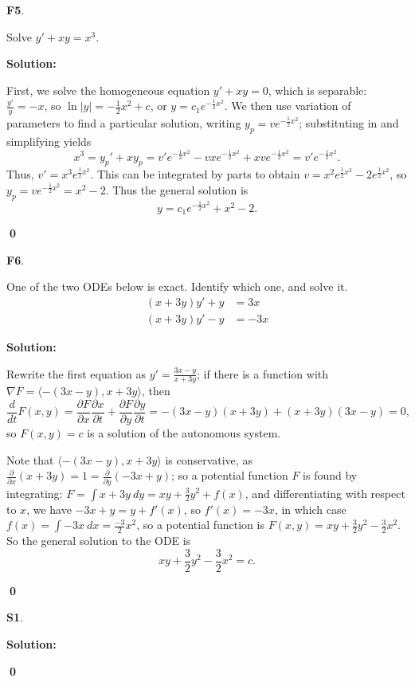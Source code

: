 \documentclass{article}
\newenvironment{problem}[1]
{
  \begin{flushleft}
  \textbf{#1}.
  \ignorespaces
}
{
  \end{flushleft}
}
\newenvironment{solution}
{
  \ignorespaces
  \textbf{Solution:}
}
{
  \ignorespacesafterend
  \begin{flushright}
  {\bfseries \qed}
  \end{flushright}
}
\begin{document}
\begin{problem}{F5}
Solve \(y'+xy=x^3\).
\end{problem}
\begin{solution}
First, we solve the homogeneous equation \(y'+xy=0\), which is separable: \(\frac{y'}{y}=-x\), so \(\ln|y|=-\frac{1}{2}x^2+c\), or \(y=c_1e^{-\frac{1}{2}x^2}\). We then use variation of parameters to find a particular solution, writing \(y_p = v e^{-\frac{1}{2}x^2}\); substituting in and simplifying yields
\[x^3 = y_p ' +xy_p = v'e^{-\frac{1}{2}x^2} -vxe^{-\frac{1}{2}x^2} + xve^{-\frac{1}{2}x^2} = v'e^{-\frac{1}{2}x^2}.\]
Thus, \(v'=x^3 e^{\frac{1}{2}x^2} \).  This can be integrated by parts to obtain \(v=x^2e^{\frac{1}{2}x^2}-2e^{\frac{1}{2}x^2}\), so \(y_p = v e^{-\frac{1}{2}x^2} = x^2-2\).  Thus the general solution is
\[y=c_1e^{-\frac{1}{2}x^2} + x^2 - 2 .\]
\end{solution}

\begin{problem}{F6}
One of the two ODEs below is exact.  Identify which one, and solve it.
\begin{align*}
 (x + 3y)y'+y &=3x \\ %
 (x + 3y)y'-y &=-3x  
\end{align*}
\end{problem}
\begin{solution}
Rewrite the first equation as \(y'=\frac{3x-y}{x+3y}\); if there is a function with \(\nabla F = \langle -(3x-y), x+3y\rangle\), then \[\frac{d}{dt}F(x,y)=\frac{\partial F}{\partial x} \frac{\partial x}{\partial t} + \frac{\partial F}{\partial y} \frac{\partial y}{\partial t} = -(3x-y)(x+3y)+(x+3y)(3x-y)=0,\] so \(F(x,y)=c\) is a solution of the autonomous system.

Note that  \(\langle -(3x-y), x+3y\rangle\) is conservative, as \(\frac{\partial}{\partial x}(x+3y)=1=\frac{\partial}{\partial y}(-3x+y)\); so a potential function \(F\) is found by integrating: \(F = \int x+3y\ dy = xy+\frac{3}{2}y^2+f(x) \), and differentiating with respect to \(x\), we have \(-3x+y=y+f'(x)\), so \(f'(x)=-3x\), in which case \(f(x)=\int -3x\ dx = \frac{-3}{2}x^2\), so a potential function is \(F(x,y)=xy+\frac{3}{2}y^2-\frac{3}{2}x^2\).  So the general solution to the ODE is
\[ xy+\frac{3}{2}y^2-\frac{3}{2}x^2 = c.\]
\end{solution}

\begin{problem}{S1}

\end{problem}
\begin{solution}

\end{solution}
\end{document}
